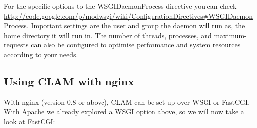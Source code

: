 \documentclass[a4paper,12pt]{report}
\begin{document}
For the specific options to the WSGIDaemonProcess directive you can check
\url{http://code.google.com/p/modwsgi/wiki/ConfigurationDirectives\#WSGIDaemonProcess}.
Important settings are the user and group the daemon will run as, the home
directory it will run in. The number of threads, processes, and
maximum-requests can also be configured to optimise performance and system
resources according to your needs.

\subsection{Using CLAM with nginx}

With nginx (version 0.8 or above), CLAM can be set up over WSGI or FastCGI.
With Apache we already explored a WSGI option above, so we will now take a look
at FastCGI:
\end{document}
